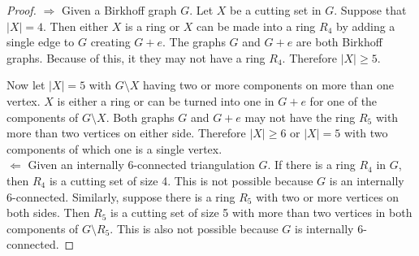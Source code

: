 \begin{proof}
\hfill\newline
$\Longrightarrow$ Given a Birkhoff graph $G$. Let $X$ be a cutting set in $G$. Suppose that $|X|=4$. Then either $X$ is a ring or $X$ can be made into a ring $R_4$ by adding a single edge to $G$ creating $G+e$. The graphs $G$ and $G+e$ are both Birkhoff graphs. Because of this, it they may not have a ring $R_4$. Therefore $|X| \geq 5$. 

Now let $|X|=5$ with $G\setminus X$ having two or more components on more than one vertex. $X$ is either a ring or can be turned into one in $G+e$ for one of the components of $G\setminus X$. Both graphs $G$ and $G+e$ may not have the ring $R_5$ with more than two vertices on either side. Therefore $|X| \geq 6$ or $|X|=5$ with two components of which one is a single vertex.\\
$\Longleftarrow$ Given an internally 6-connected triangulation $G$. If there is a ring $R_4$ in $G$, then $R_4$ is a cutting set of size 4. This is not possible because $G$ is an internally 6-connected. Similarly, suppose there is a ring $R_5$ with two or more vertices on both sides. Then $R_5$ is a cutting set of size 5 with more than two vertices in both components of $G\setminus R_5$. This is also not possible because $G$ is internally 6-connected.
\end{proof}